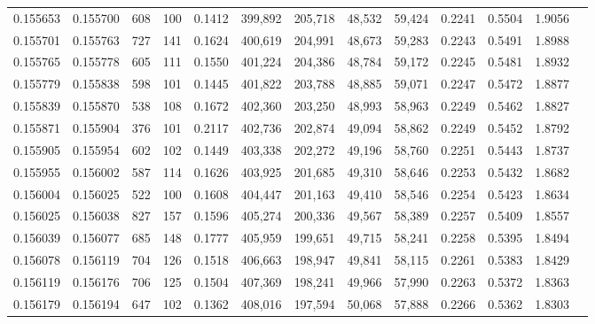 \begin{tabular}{rrrrrrrrrrrrr}
0.155653 & 0.155700 &   608 & 100 &                                     0.1412 & 399,892 & 205,718 &  48,532 &  59,424 & 0.2241 & 0.5504 & 1.9056 \\
0.155701 & 0.155763 &   727 & 141 &                                     0.1624 & 400,619 & 204,991 &  48,673 &  59,283 & 0.2243 & 0.5491 & 1.8988 \\
0.155765 & 0.155778 &   605 & 111 &                                     0.1550 & 401,224 & 204,386 &  48,784 &  59,172 & 0.2245 & 0.5481 & 1.8932 \\
0.155779 & 0.155838 &   598 & 101 &                                     0.1445 & 401,822 & 203,788 &  48,885 &  59,071 & 0.2247 & 0.5472 & 1.8877 \\
0.155839 & 0.155870 &   538 & 108 &                                     0.1672 & 402,360 & 203,250 &  48,993 &  58,963 & 0.2249 & 0.5462 & 1.8827 \\
0.155871 & 0.155904 &   376 & 101 &                                     0.2117 & 402,736 & 202,874 &  49,094 &  58,862 & 0.2249 & 0.5452 & 1.8792 \\
0.155905 & 0.155954 &   602 & 102 &                                     0.1449 & 403,338 & 202,272 &  49,196 &  58,760 & 0.2251 & 0.5443 & 1.8737 \\
0.155955 & 0.156002 &   587 & 114 &                                     0.1626 & 403,925 & 201,685 &  49,310 &  58,646 & 0.2253 & 0.5432 & 1.8682 \\
0.156004 & 0.156025 &   522 & 100 &                                     0.1608 & 404,447 & 201,163 &  49,410 &  58,546 & 0.2254 & 0.5423 & 1.8634 \\
0.156025 & 0.156038 &   827 & 157 &                                     0.1596 & 405,274 & 200,336 &  49,567 &  58,389 & 0.2257 & 0.5409 & 1.8557 \\
0.156039 & 0.156077 &   685 & 148 &                                     0.1777 & 405,959 & 199,651 &  49,715 &  58,241 & 0.2258 & 0.5395 & 1.8494 \\
0.156078 & 0.156119 &   704 & 126 &                                     0.1518 & 406,663 & 198,947 &  49,841 &  58,115 & 0.2261 & 0.5383 & 1.8429 \\
0.156119 & 0.156176 &   706 & 125 &                                     0.1504 & 407,369 & 198,241 &  49,966 &  57,990 & 0.2263 & 0.5372 & 1.8363 \\
0.156179 & 0.156194 &   647 & 102 &                                     0.1362 & 408,016 & 197,594 &  50,068 &  57,888 & 0.2266 & 0.5362 & 1.8303 \\

\end{tabular}

